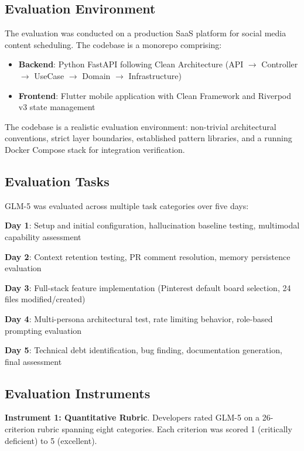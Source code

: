 \documentclass[conference]{IEEEtran}
\begin{document}
\subsection{Evaluation Environment}
The evaluation was conducted on a production SaaS platform for social media content scheduling. The codebase is a monorepo comprising:
\begin{itemize}
    \item \textbf{Backend}: Python FastAPI following Clean Architecture (API $\rightarrow$ Controller $\rightarrow$ UseCase $\rightarrow$ Domain $\rightarrow$ Infrastructure)
    \item \textbf{Frontend}: Flutter mobile application with Clean Framework and Riverpod v3 state management
\end{itemize}

The codebase is a realistic evaluation environment: non-trivial architectural conventions, strict layer boundaries, established pattern libraries, and a running Docker Compose stack for integration verification.

\subsection{Evaluation Tasks}
GLM-5 was evaluated across multiple task categories over five days:

\textbf{Day 1}: Setup and initial configuration, hallucination baseline testing, multimodal capability assessment

\textbf{Day 2}: Context retention testing, PR comment resolution, memory persistence evaluation

\textbf{Day 3}: Full-stack feature implementation (Pinterest default board selection, 24 files modified/created)

\textbf{Day 4}: Multi-persona architectural test, rate limiting behavior, role-based prompting evaluation

\textbf{Day 5}: Technical debt identification, bug finding, documentation generation, final assessment

\subsection{Evaluation Instruments}

\textbf{Instrument 1: Quantitative Rubric}. Developers rated GLM-5 on a 26-criterion rubric spanning eight categories. Each criterion was scored 1 (critically deficient) to 5 (excellent).
\end{document}
